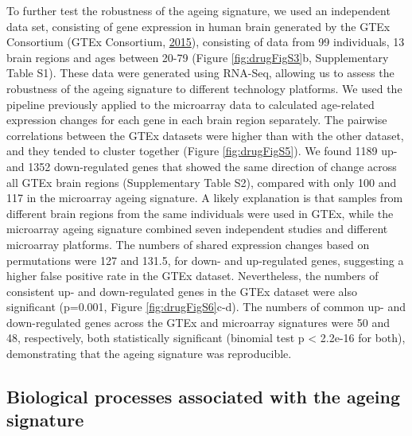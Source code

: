 \documentclass[12pt,twoside]{unicam}
\begin{document}
To further test the robustness of the ageing signature, we used an independent data set, consisting of gene expression in human brain generated by the GTEx Consortium (GTEx Consortium, \protect\hyperlink{ref-GTEx_Consortium2015}{2015}), consisting of data from 99 individuals, 13 brain regions and ages between 20-79 (Figure \ref{fig:drugFigS3}b, Supplementary Table S1). These data were generated using RNA-Seq, allowing us to assess the robustness of the ageing signature to different technology platforms. We used the pipeline previously applied to the microarray data to calculated age-related expression changes for each gene in each brain region separately. The pairwise correlations between the GTEx datasets were higher than with the other dataset, and they tended to cluster together (Figure \ref{fig:drugFigS5}). We found 1189 up- and 1352 down-regulated genes that showed the same direction of change across all GTEx brain regions (Supplementary Table S2), compared with only 100 and 117 in the microarray ageing signature. A likely explanation is that samples from different brain regions from the same individuals were used in GTEx, while the microarray ageing signature combined seven independent studies and different microarray platforms. The numbers of shared expression changes based on permutations were 127 and 131.5, for down- and up-regulated genes, suggesting a higher false positive rate in the GTEx dataset. Nevertheless, the numbers of consistent up- and down-regulated genes in the GTEx dataset were also significant (p=0.001, Figure \ref{fig:drugFigS6}c-d). The numbers of common up- and down-regulated genes across the GTEx and microarray signatures were 50 and 48, respectively, both statistically significant (binomial test p \textless{} 2.2e-16 for both), demonstrating that the ageing signature was reproducible.

\hypertarget{ageingSignatureBiology}{%
\subsection{Biological processes associated with the ageing signature}\label{ageingSignatureBiology}}
\end{document}
